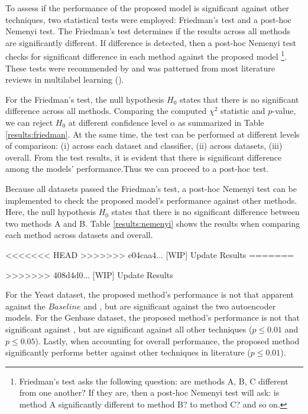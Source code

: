 To assess if the performance of the proposed model is significant against other
techniques, two statistical tests were employed: Friedman's test
and a post-hoc Nemenyi test. The Friedman's test determines if the results across all
methods are significantly different. If difference is detected, then a post-hoc
Nemenyi test checks for significant difference in each method against the proposed
model \footnote[2]{Friedman's test asks the following question: are methods A,
B, C different from one another? If they are, then a post-hoc Nemenyi test will
ask: is method A significantly different to method B? to method C? and so on.}.
These tests were recommended by \cite{demsar2006statistical}  and was patterned
from most literature reviews in multilabel learning
(\cite{madjarov2012extensive, zhang2014review}). 

\par For the Friedman's test, the null hypothesis $H_{0}$ states that there is no
significant difference across all methods. Comparing the computed
$\chi^{2}$ statistic and $p$-value, we can reject $H_{0}$ at different
confidence level $\alpha$ as summarized in Table
\ref{results:friedman}. At the same time, the test can be performed at
different levels of comparison: (i) across each dataset and classifier, (ii)
across datasets, (iii) overall. From the test results, it is evident that
there is significant difference among the models' performance.Thus we can
proceed to a post-hoc test.

\par Because all datasets passed the Friedman's test, a post-hoc Nemenyi test
can be implemented to check the proposed model's performance against other
methods. Here, the null hypothesis $H_{0}$ states that there is no
significant difference between two methods A and B. Table
\ref{results:nemenyi} shows the results when comparing each method across
datasets and overall. 



<<<<<<< HEAD
>>>>>>> e04caa4... [WIP] Update Results
=======


>>>>>>> 408d4d0... [WIP] Update Results

\par For the Yeast dataset, the proposed method's performance is not that
apparent against the $\textit{Baseline}$ and \cite{wang2013protein}, but are
significant against the two autoencoder models. For the Genbase dataset, the
proposed method's performance is not that significant against
\cite{miranda2017feature}, but are significant against all other techniques ($p
\leq 0.01$ and $p \leq 0.05$). Lastly, when accounting for overall performance,
the proposed method significantly performs better against other techniques in
literature ($p \leq 0.01$).

